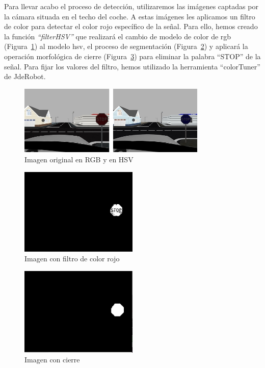 Para llevar acabo el proceso de detección, utilizaremos las imágenes captadas por la cámara situada en el techo del coche. A estas imágenes les aplicamos un filtro de color para detectar el color rojo específico de la señal. Para ello, hemos creado la función \textit{``filterHSV''} que realizará el cambio de modelo de color de \acrshort{rgb} (Figura~\ref{fig.imgRGByHSV}) al modelo \acrshort{hsv}, el proceso de segmentación (Figura~\ref{fig.colorFilterRed}) y aplicará la operación morfológica de cierre (Figura~\ref{fig.close}) para eliminar la palabra ``STOP'' de la señal. Para fijar los valores del filtro, hemos utilizado la herramienta ``colorTuner'' de JdeRobot.\\

\begin{figure}[H]
  \begin{center}
    \includegraphics[width=0.8\textwidth]{figures/Stop/imgRGByHSV.jpg}
		\caption{Imagen original en RGB y en HSV}
		\label{fig.imgRGByHSV}
		\end{center}
\end{figure}

\begin{figure}[H]
  \begin{center}
    \includegraphics[width=0.5\textwidth]{figures/Stop/colorFilterRed.jpg}
		\caption{Imagen con filtro de color rojo}
		\label{fig.colorFilterRed}
		\end{center}
\end{figure}

\begin{figure}[H]
  \begin{center}
    \includegraphics[width=0.5\textwidth]{figures/Stop/close.jpg}
		\caption{Imagen con cierre}
		\label{fig.close}
		\end{center}
\end{figure}


